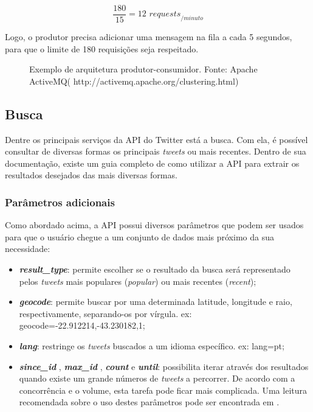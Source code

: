 $$ \frac{180}{15} = 12 \textit{ requests}_{/minuto} $$

Logo, o produtor precisa adicionar uma mensagem na fila a cada 5 segundos, para que o limite de 180 requisições seja respeitado.

\begin{figure}[H]
	\centering{}
	\caption{Exemplo de arquitetura produtor-consumidor. Fonte: Apache ActiveMQ( http://activemq.apache.org/clustering.html)}
	\label{time}
\end{figure}


\subsection{Busca}
Dentre os principais serviços da API do Twitter está a busca. Com ela, é possível consultar de diversas formas os principais \textit{tweets} ou mais recentes. Dentro de sua documentação, existe um guia completo de como utilizar a API  para extrair os resultados desejados \cite{twittersearchapi} das mais diversas formas. 

\subsubsection{Parâmetros adicionais}

Como abordado acima, a API possui diversos parâmetros que podem ser usados para que o usuário chegue a um conjunto de dados mais próximo da sua necessidade:

\begin{itemize}
	\item \textit{\textbf{result\_type}}: permite escolher se o resultado da busca será representado pelos \textit{tweets} mais populares (\textit{popular}) ou mais recentes (\textit{recent});
	\item \textit{\textbf{geocode}}: permite buscar por uma determinada latitude, longitude e raio, respectivamente, separando-os por vírgula. ex: geocode=-22.912214,-43.230182,1;
	\item \textit{\textbf{lang}}: restringe os \textit{tweets} buscados a um idioma específico. ex: lang=pt;
	\item \textit{\textbf{since\_id }},  \textit{\textbf{max\_id }}, \textit{\textbf{count}} e \textit{\textbf{until}}: possibilita iterar através dos resultados quando existe um grande números de \textit{tweets} a percorrer. De acordo com a concorrência e o volume, esta tarefa pode ficar mais complicada. Uma leitura recomendada sobre o uso destes parâmetros pode ser encontrada em \cite{workingwithtimelimes}.
\end{itemize}

